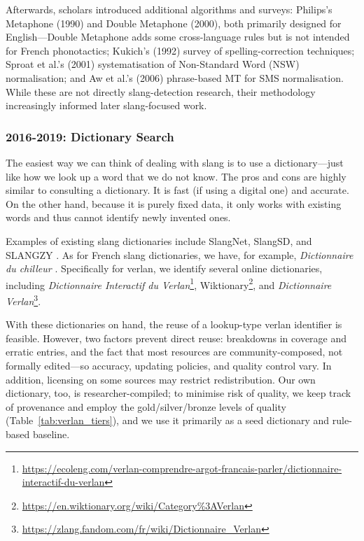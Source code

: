 \documentclass[12pt]{article}
\begin{document}
Afterwards, scholars introduced additional algorithms and surveys: Philips's Metaphone (1990) and Double Metaphone (2000), both primarily designed for English\;---\;Double Metaphone adds some cross-language rules but is not intended for French phonotactics; Kukich's (1992) survey of spelling-correction techniques; Sproat et al.'s (2001) systematisation of Non-Standard Word (NSW) normalisation; and Aw et al.'s (2006) phrase-based MT for SMS normalisation. \cite{philips1990metaphone,philips2000doublemetaphone,kukich1992techniques,sproat2001normalization,aw2006phrase} While these are not directly slang-detection research, their methodology increasingly informed later slang-focused work.



\subsubsection{2016-2019: Dictionary Search}

The easiest way we can think of dealing with slang is to use a dictionary\;---\;just like how we look up a word that we do not know. The pros and cons are highly similar to consulting a dictionary. It is fast (if using a digital one) and accurate. On the other hand, because it is purely fixed data, it only works with existing words and thus cannot identify newly invented ones.

Examples of existing slang dictionaries include SlangNet, SlangSD, and SLANGZY \cite{dhuliawala2016slangnet, wu2018slangsd, gupta2019slangzy}. As for French slang dictionaries, we have, for example, \textit{Dictionnaire du chilleur} \cite{dictionnaire2024chilleur}. Specifically for verlan, we identify several online dictionaries, including \textit{Dictionnaire Interactif du Verlan}\footnote{\url{https://ecoleng.com/verlan-comprendre-argot-francais-parler/dictionnaire-interactif-du-verlan}}, Wiktionary\footnote{\url{https://en.wiktionary.org/wiki/Category\%3AVerlan}}, and \textit{Dictionnaire Verlan}\footnote{\url{https://zlang.fandom.com/fr/wiki/Dictionnaire_Verlan}}.

With these dictionaries on hand, the reuse of a lookup-type verlan identifier is feasible. However, two factors prevent direct reuse: breakdowns in coverage and erratic entries, and the fact that most resources are community-composed, not formally edited\;---\;so accuracy, updating policies, and quality control vary. In addition, licensing on some sources may restrict redistribution. Our own dictionary, too, is researcher-compiled; to minimise risk of quality, we keep track of provenance and employ the gold/silver/bronze levels of quality (Table~\ref{tab:verlan_tiers}), and we use it primarily as a seed dictionary and rule-based baseline.
\end{document}
